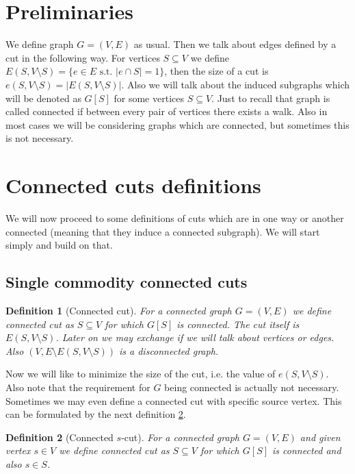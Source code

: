 \documentclass{article}
\theoremstyle{plain}
\theoremstyle{plain}
\newtheorem{defn}{Definition}
\theoremstyle{remark}
\begin{document}
	\section{Preliminaries}
	
	We define graph $G = (V,E)$ as usual. Then we talk about edges defined by a cut in the following way. For vertices $S \subseteq V$ we define $E(S, V \setminus S) = \{e \in E \text{ s.t. } |e \cap S| = 1\}$, then the size of a cut is $e(S, V \setminus S) = |E(S, V \setminus S)|$. Also we will talk about the induced subgraphs which will be denoted as $G[S]$ for some vertices $S \subseteq V$. Just to recall that graph is called connected if between every pair of vertices there exists a walk. Also in most cases we will be considering graphs which are connected, but sometimes this is not necessary.
	
	
	\section{Connected cuts definitions}
	
	We will now proceed to some definitions of cuts which are in one way or another connected (meaning that they induce a connected subgraph). We will start simply and build on that.
	
	\subsection{Single commodity connected cuts}
	
	\begin{defn}[Connected cut]
		For a connected graph $G = (V,E)$ we define connected cut as $S \subseteq V$ for which $G[S]$ is connected. The cut itself is $E(S, V \setminus S)$. Later on we may exchange if we will talk about vertices or edges. Also $(V, E \setminus E(S, V \setminus S))$ is a disconnected graph.
		\label{def-connected-cut}
	\end{defn}
	
	Now we will like to minimize the size of the cut, i.e. the value of $e(S, V \setminus S)$. Also note that the requirement for $G$ being connected is actually not necessary. Sometimes we may even define a connected cut with specific source vertex. This can be formulated by the next definition \ref{def-connected-s-cut}.
	
	\begin{defn}[Connected $s$-cut]
		For a connected graph $G = (V,E)$ and given vertex $s \in V$ we define connected cut as $S \subseteq V$ for which $G[S]$ is connected and also $s \in S$.
		\label{def-connected-s-cut}
	\end{defn}
\end{document}
